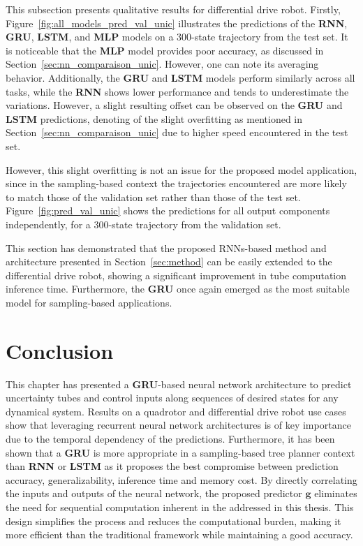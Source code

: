 This subsection presents qualitative results for differential drive robot.
Firstly, Figure~\ref{fig:all_models_pred_val_unic} illustrates the predictions of the \textbf{RNN}, \textbf{GRU}, \textbf{LSTM}, and \textbf{MLP} models on a 300-state trajectory from the test set.
It is noticeable that the \textbf{MLP} model provides poor accuracy, as discussed in Section~\ref{sec:nn_comparaison_unic}.
However, one can note its averaging behavior.
Additionally, the \textbf{GRU} and \textbf{LSTM} models perform similarly across all tasks, while the \textbf{RNN} shows lower performance and tends to underestimate the variations.
However, a slight resulting offset can be observed on the \textbf{GRU} and \textbf{LSTM} predictions, denoting of the slight overfitting as mentioned in Section~\ref{sec:nn_comparaison_unic} due to higher speed encountered in the test set.

However, this slight overfitting is not an issue for the proposed model application, since in the sampling-based context the trajectories encountered are more likely to match those of the validation set rather than those of the test set.
Figure~\ref{fig:pred_val_unic} shows the predictions for all output components independently, for a 300-state trajectory from the validation set.

This section has demonstrated that the proposed RNNs-based method and architecture presented in Section~\ref{sec:method} can be easily extended to the differential drive robot, showing a significant improvement in tube computation inference time.
Furthermore, the \textbf{GRU} once again emerged as the most suitable model for sampling-based applications.

\section{Conclusion} \label{sec:NN_concl}

This chapter has presented a \textbf{GRU}-based neural network architecture to predict uncertainty tubes and control inputs along sequences of desired states for any dynamical system.
Results on a quadrotor and differential drive robot use cases show that leveraging recurrent neural network architectures is of key importance due to the temporal dependency of the predictions.
Furthermore, it has been shown that a \textbf{GRU} is more appropriate in a sampling-based tree planner context than \textbf{RNN} or \textbf{LSTM} as it proposes the best compromise between prediction accuracy, generalizability, inference time and memory cost.
By directly correlating the inputs and outputs of the neural network, the proposed predictor $\boldsymbol{g}$ eliminates the need for sequential computation inherent in the  addressed in this thesis. 
This design simplifies the process and reduces the computational burden, making it more efficient than the traditional  framework while maintaining a good accuracy.

